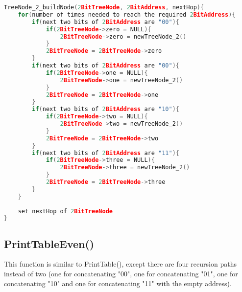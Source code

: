 \documentclass[a4paper]{article}
\begin{document}
\begin{lstlisting}[language=c]
TreeNode_2_buildNode(2BitTreeNode, 2BitAddress, nextHop){
    for(number of times needed to reach the required 2BitAddress){
        if(next two bits of 2BitAddress are "00"){
            if(2BitTreeNode->zero = NULL){
                2BitTreeNode->zero = newTreeNode_2()
            }
            2BitTreeNode = 2BitTreeNode->zero
        }
        if(next two bits of 2BitAddress are "00"){
            if(2BitTreeNode->one = NULL){
                2BitTreeNode->one = newTreeNode_2()
            }
            2BitTreeNode = 2BitTreeNode->one
        }
        if(next two bits of 2BitAddress are "10"){
            if(2BitTreeNode->two = NULL){
                2BitTreeNode->two = newTreeNode_2()
            }
            2BitTreeNode = 2BitTreeNode->two
        }
        if(next two bits of 2BitAddress are "11"){
            if(2BitTreeNode->three = NULL){
                2BitTreeNode->three = newTreeNode_2()
            }
            2BitTreeNode = 2BitTreeNode->three
        }
    }
    
    set nextHop of 2BitTreeNode
}
\end{lstlisting}

\subsection{PrintTableEven()}

This function is similar to PrintTable(), except there are four recursion paths instead of two (one for concatenating "00", one for concatenating "01", one for concatenating "10" and one for concatenating "11" with the empty address).
\end{document}
